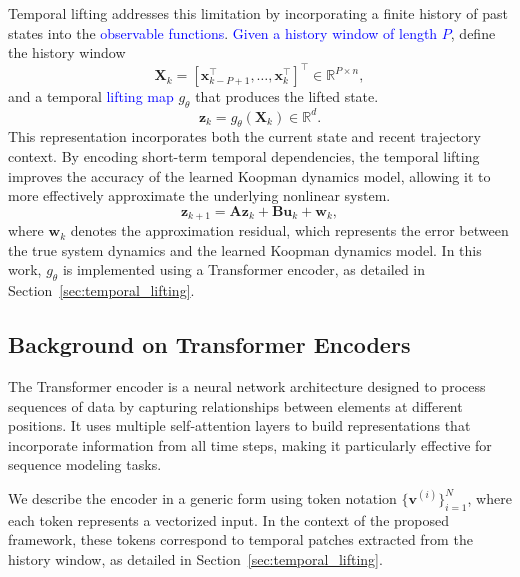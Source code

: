 \documentclass[journal]{IEEEtran}
\newcommand{\vx}{\mathbf{x}}
\newcommand{\vu}{\mathbf{u}}
\newcommand{\vz}{\mathbf{z}}
\newcommand{\vw}{\mathbf{w}}
\newcommand{\mA}{\mathbf{A}}
\newcommand{\mB}{\mathbf{B}}
\newcommand{\mX}{\mathbf{X}}
\begin{document}
Temporal lifting addresses this limitation by incorporating a finite history of past states into the \textcolor{blue}{observable functions}. \textcolor{blue}{Given a history window of length $P$}, define the history window
\begin{equation}
    \mX_k = [\vx_{k-P+1}^\top, \ldots, \vx_k^\top]^\top \in \mathbb{R}^{P\times n},
    \label{eq:history_window}
\end{equation}
and a temporal \textcolor{blue}{lifting map} $g_\theta$ that produces the lifted state.
\begin{equation}
    \vz_k = g_\theta(\mX_k) \in \mathbb{R}^d.
    \label{eq:temporal_lifting}
\end{equation}
This representation incorporates both the current state and recent trajectory context. By encoding short-term temporal dependencies, the temporal lifting improves the accuracy of the learned Koopman dynamics model, allowing it to more effectively approximate the underlying nonlinear system.
\begin{equation}
    \vz_{k+1} = \mA \vz_k + \mB \vu_k + \vw_k,
    \label{eq:lifted_dynamics_prelim}
\end{equation}
where $\vw_k$ denotes the approximation residual, which represents the error between the true system dynamics and the learned Koopman dynamics model. In this work, $g_\theta$ is implemented using a Transformer encoder, as detailed in Section~\ref{sec:temporal_lifting}.

\subsection{Background on Transformer Encoders}
\label{sec:transformer_background}

The Transformer encoder \cite{vaswani2017attention} is a neural network architecture designed to process sequences of data by capturing relationships between elements at different positions. It uses multiple self-attention layers to build representations that incorporate information from all time steps, making it particularly effective for sequence modeling tasks.

We describe the encoder in a generic form using token notation $\{\mathbf{v}^{(i)}\}_{i=1}^{N}$, where each token represents a vectorized input. In the context of the proposed framework, these tokens correspond to temporal patches extracted from the history window, as detailed in Section~\ref{sec:temporal_lifting}.
\end{document}
